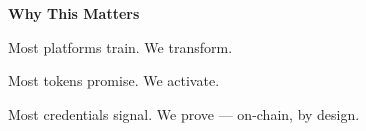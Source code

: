 \vspace{0.5em}

\textbf{Why This Matters}

Most platforms train. We transform.

Most tokens promise. We activate.

Most credentials signal. We prove — on-chain, by design.

\vspace{1em}


\newpage
